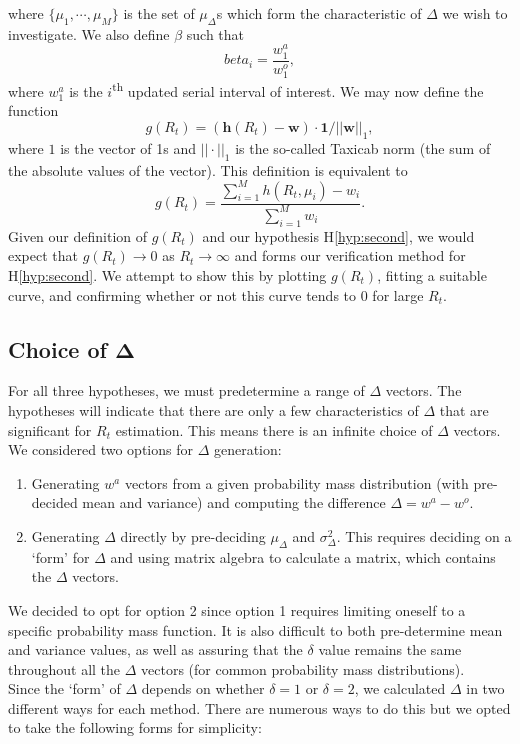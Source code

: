\documentclass[10pt,journal,compsoc]{IEEEtran}
\newcommand{\ts}{\textsuperscript}
\begin{document}
where $\{\mu_1, \cdots , \mu_M\}$ is the set of $\mu_{\Delta}$s which form the characteristic of $\Delta$ we wish to investigate. We also define $\beta$ such that $$beta_i = \frac{w_1^a}{w_1^o},$$
where $w_1^a$ is the $i$\ts{th} updated serial interval of interest. We may now define the function $$ g(R_t) = (\boldsymbol{h}(R_t)-\boldsymbol{w})\cdot \boldsymbol{1}/||\boldsymbol{w}||_1,$$
where $1$ is the vector of 1s and $||\cdot||_1$ is the so-called Taxicab norm (the sum of the absolute values of the vector). This definition is equivalent to $$ g(R_t) = \frac{\sum_{i=1}^M h(R_t, \mu_i)-w_i}{\sum_{i=1}^M w_i}.$$ Given our definition of $g(R_t)$ and our hypothesis H\ref{hyp:second}, we would expect that $g(R_t) \rightarrow 0$ as $R_t \rightarrow \infty$ and forms our verification method for H\ref{hyp:second}. We attempt to show this by plotting $g(R_t)$, fitting a suitable curve, and confirming whether or not this curve tends to 0 for large $R_t$.\\

\subsection{Choice of $\boldsymbol{\Delta}$}

For all three hypotheses, we must predetermine a range of $\Delta$ vectors. The hypotheses will indicate that there are only a few characteristics of $\Delta$ that are significant for $R_t$ estimation. This means there is an infinite choice of $\Delta$ vectors. We considered two options for $\Delta$ generation:
\begin{enumerate}
    \item Generating $w^a$ vectors from a given probability mass distribution (with pre-decided mean and variance) and computing the difference $\Delta = w^a-w^o$.
    \item Generating $\Delta$ directly by pre-deciding $\mu_{\Delta}$ and $\sigma^2_{\Delta}$. This requires deciding on a `form' for $\Delta$ and using matrix algebra to calculate a matrix, which contains the $\Delta$ vectors.
\end{enumerate}
We decided to opt for option 2 since option 1 requires limiting oneself to a specific probability mass function. It is also difficult to both pre-determine mean and variance values, as well as assuring that the $\delta$ value remains the same throughout all the $\Delta$ vectors (for common probability mass distributions).\\

Since the `form' of $\Delta$ depends on whether $\delta=1$ or $\delta=2$, we calculated $\Delta$ in two different ways for each method. There are numerous ways to do this but we opted to take the following forms for simplicity:
\end{document}
